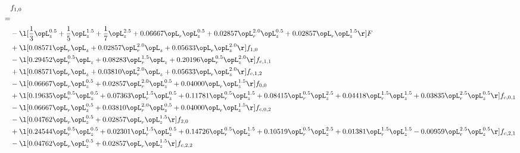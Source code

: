 \begin{alignat}{2} 
\label{eq:f_10_1} 
& f_{1,0} \nonumber \\ 
 = \\ 
& - \l[ \frac{1}{3} \opL_z^{0.5} + \frac{1}{5} \opL_z^{1.5} + \frac{1}{7} \opL_z^{2.5} +  0.06667 \opL_r \opL_z^{0.5} +  0.02857 \opL_r^{2.0} \opL_z^{0.5} +  0.02857 \opL_r \opL_z^{1.5}  \r] F \nonumber \\ 
& + \l[  0.08571 \opL_r \opL_z +  0.02857 \opL_r^{2.0} \opL_z +  0.05633 \opL_r \opL_z^{2.0}  \r] f_{1,0} \nonumber \\ 
& - \l[  0.29452 \opL_r^{0.5} \opL_z +  0.08283 \opL_r^{1.5} \opL_z +  0.20196 \opL_r^{0.5} \opL_z^{2.0}  \r] f_{c,1,1} \nonumber \\ 
& + \l[  0.08571 \opL_r \opL_z +  0.03810 \opL_r^{2.0} \opL_z +  0.05633 \opL_r \opL_z^{2.0}  \r] f_{c,1,2} \nonumber \\ 
& - \l[  0.06667 \opL_r \opL_z^{0.5} +  0.02857 \opL_r^{2.0} \opL_z^{0.5} +  0.04000 \opL_r \opL_z^{1.5}  \r] f_{0,0} \nonumber \\ 
& + \l[  0.19635 \opL_r^{0.5} \opL_z^{0.5} +  0.07363 \opL_r^{1.5} \opL_z^{0.5} +  0.11781 \opL_r^{0.5} \opL_z^{1.5} +  0.08415 \opL_r^{0.5} \opL_z^{2.5} +  0.04418 \opL_r^{1.5} \opL_z^{1.5} +  0.03835 \opL_r^{2.5} \opL_z^{0.5}  \r] f_{c,0,1} \nonumber \\ 
& - \l[  0.06667 \opL_r \opL_z^{0.5} +  0.03810 \opL_r^{2.0} \opL_z^{0.5} +  0.04000 \opL_r \opL_z^{1.5}  \r] f_{c,0,2} \nonumber \\ 
& - \l[  0.04762 \opL_r \opL_z^{0.5} +  0.02857 \opL_r \opL_z^{1.5}  \r] f_{2,0} \nonumber \\ 
& + \l[  0.24544 \opL_r^{0.5} \opL_z^{0.5} +  0.02301 \opL_r^{1.5} \opL_z^{0.5} +  0.14726 \opL_r^{0.5} \opL_z^{1.5} +  0.10519 \opL_r^{0.5} \opL_z^{2.5} +  0.01381 \opL_r^{1.5} \opL_z^{1.5}   -0.00959 \opL_r^{2.5} \opL_z^{0.5}  \r] f_{c,2,1} \nonumber \\ 
& - \l[  0.04762 \opL_r \opL_z^{0.5} +  0.02857 \opL_r \opL_z^{1.5}  \r] f_{c,2,2} \nonumber \\ 
\end{alignat} 


